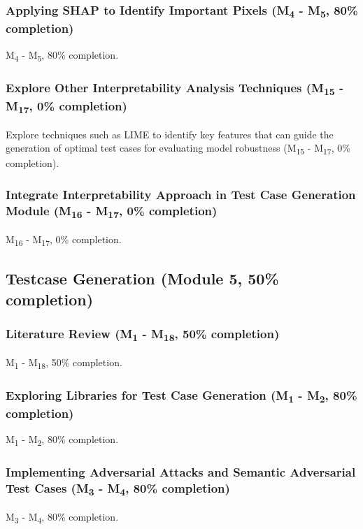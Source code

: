 \subsubsection{Applying SHAP to Identify Important Pixels (M\textsubscript{4} - M\textsubscript{5}, 80\% completion)}
M\textsubscript{4} - M\textsubscript{5}, 80\% completion.

\subsubsection{Explore Other Interpretability Analysis Techniques (M\textsubscript{15} - M\textsubscript{17}, 0\% completion)}
Explore techniques such as LIME to identify key features that can guide the generation of optimal test cases for evaluating model robustness (M\textsubscript{15} - M\textsubscript{17}, 0\% completion).

\subsubsection{Integrate Interpretability Approach in Test Case Generation Module (M\textsubscript{16} - M\textsubscript{17}, 0\% completion)}
M\textsubscript{16} - M\textsubscript{17}, 0\% completion.

\subsection{Testcase Generation (Module 5, 50\% completion)}
\subsubsection{Literature Review (M\textsubscript{1} - M\textsubscript{18}, 50\% completion)}
M\textsubscript{1} - M\textsubscript{18}, 50\% completion.

\subsubsection{Exploring Libraries for Test Case Generation (M\textsubscript{1} - M\textsubscript{2}, 80\% completion)}
M\textsubscript{1} - M\textsubscript{2}, 80\% completion.

\subsubsection{Implementing Adversarial Attacks and Semantic Adversarial Test Cases (M\textsubscript{3} - M\textsubscript{4}, 80\% completion)}
M\textsubscript{3} - M\textsubscript{4}, 80\% completion.

